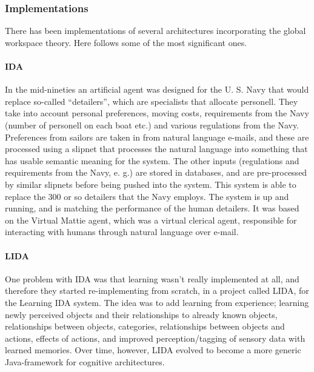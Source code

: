 \subsubsection{Implementations}
There has been implementations of several architectures incorporating the global workspace theory. Here follows some of the most significant ones.

\paragraph{IDA}
In the mid-nineties an artificial agent was designed for the U. S. Navy that would replace so-called ``detailers'', which are specialists that allocate personell. They take into account personal preferences, moving costs, requirements from the Navy (number of personell on each boat etc.) and various regulations from the Navy. Preferences from sailors are taken in from natural language e-mails, and these are processed using a slipnet that processes the natural language into something that has usable semantic meaning for the system. The other inputs (regulations and requirements from the Navy, e. g.) are stored in databases, and are pre-processed by similar slipnets before being pushed into the system. This system is able to replace the 300 or so detailers that the Navy employs. The system is up and running, and is matching the performance of the human detailers. \cite{baars2007architectural}\cite{franklin1998ida} It was based on the Virtual Mattie agent, which was a virtual clerical agent, responsible for interacting with humans through natural language over e-mail.\cite{franklin1996virtual}

\paragraph{LIDA}
One problem with IDA was that learning wasn't really implemented at all, and therefore they started re-implementing from scratch, in a project called LIDA, for the Learning IDA system. The idea was to add learning from experience; learning newly perceived objects and their relationships to already known objects, relationships between objects, categories, relationships between objects and actions, effects of actions, and improved perception/tagging of sensory data with learned memories.\cite{franklin2006lida} Over time, however, LIDA evolved to become a more generic Java-framework for cognitive architectures.\cite{snaider2011lida}

